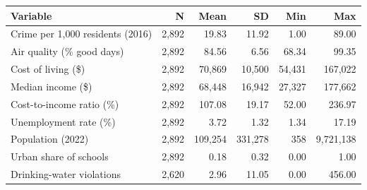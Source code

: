 \begin{tabular}{@{}lrrrrr@{}}
\toprule
Variable & N & Mean & SD & Min & Max \\
\midrule
Crime per 1,000 residents (2016) & 2,892 & 19.83 & 11.92 & 1.00 & 89.00 \\
Air quality (\% good days) & 2,892 & 84.56 & 6.56 & 68.34 & 99.35 \\
Cost of living (\$) & 2,892 & 70,869 & 10,500 & 54,431 & 167,022 \\
Median income (\$) & 2,892 & 68,448 & 16,942 & 27,327 & 177,662 \\
Cost-to-income ratio (\%) & 2,892 & 107.08 & 19.17 & 52.00 & 236.97 \\
Unemployment rate (\%) & 2,892 & 3.72 & 1.32 & 1.34 & 17.19 \\
Population (2022) & 2,892 & 109,254 & 331,278 & 358 & 9,721,138 \\
Urban share of schools & 2,892 & 0.18 & 0.32 & 0.00 & 1.00 \\
Drinking-water violations & 2,620 & 2.96 & 11.05 & 0.00 & 456.00 \\
\bottomrule
\end{tabular}
